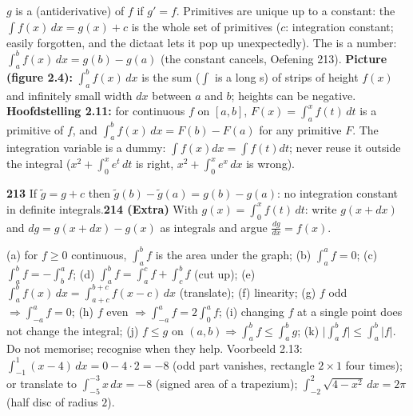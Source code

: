 \begin{key}
$g$ is a  (antiderivative) of $f$ if $g'=f$. Primitives are unique up to a constant: the  $\int f(x)\,dx=g(x)+c$ is the whole set of primitives ($c$: integration constant; easily forgotten, and the dictaat lets it pop up unexpectedly). The  is a number: $\int_a^bf(x)\,dx=g(b)-g(a)$ (the constant cancels, Oefening 213). \textbf{Picture (figure 2.4):} $\int_a^bf(x)\,dx$ is the sum ($\int$ is a long s) of strips of height $f(x)$ and infinitely small width $dx$ between $a$ and $b$; heights can be negative. \textbf{Hoofdstelling 2.11:} for continuous $f$ on $[a,b]$, $F(x)=\int_a^xf(t)\,dt$ is a primitive of $f$, and $\int_a^bf(x)\,dx=F(b)-F(a)$ for any primitive $F$. The integration variable is a dummy: $\int f(x)dx=\int f(t)dt$; never reuse it outside the integral ($x^2+\int_0^xe^t\,dt$ is right, $x^2+\int_0^xe^x\,dx$ is wrong).
\end{key}

\begin{trybox}[{213, 214 (Extra)}]
\textbf{213} If $\tilde g=g+c$ then $\tilde g(b)-\tilde g(a)=g(b)-g(a)$: no integration constant in definite integrals.\quad \textbf{214 (Extra)} With $g(x)=\int_0^xf(t)\,dt$: write $g(x+dx)$ and $dg=g(x+dx)-g(x)$ as integrals and argue $\frac{dg}{dx}=f(x)$.
\end{trybox}

\begin{result}
(a) for $f\ge0$ continuous, $\int_a^bf$ is the area under the graph; (b) $\int_a^af=0$; (c) $\int_a^bf=-\int_b^af$; (d) $\int_a^bf=\int_a^cf+\int_c^bf$ (cut up); (e) $\int_a^bf(x)\,dx=\int_{a+c}^{b+c}f(x-c)\,dx$ (translate); (f) linearity; (g) $f$ odd $\Rightarrow\int_{-a}^af=0$; (h) $f$ even $\Rightarrow\int_{-a}^af=2\int_0^af$; (i) changing $f$ at a single point does not change the integral; (j) $f\le g$ on $(a,b)\Rightarrow\int_a^bf\le\int_a^bg$; (k) $\big|\int_a^bf\big|\le\int_a^b|f|$. Do not memorise; recognise when they help. Voorbeeld 2.13: $\int_{-1}^1(x-4)\,dx=0-4\cdot2=-8$ (odd part vanishes, rectangle $2\times1$ four times); or translate to $\int_{-5}^{-3}x\,dx=-8$ (signed area of a trapezium); $\int_{-2}^2\sqrt{4-x^2}\,dx=2\pi$ (half disc of radius $2$).
\end{result}

